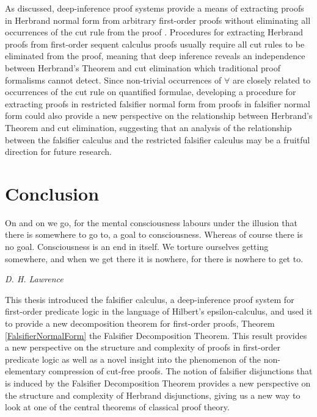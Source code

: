 \documentclass[10pt]{article}
\theoremstyle{definition}\newtheorem{remark}[theorem]{Remark}
\theoremstyle{definition}\newtheorem{example}[theorem]{Example}
\theoremstyle{definition}\newtheorem{definition}[theorem]{Definition}
\begin{document}
	As discussed, deep-inference proof systems provide a means of extracting proofs in Herbrand normal form from arbitrary first-order proofs without eliminating all occurrences of the cut rule from the proof \cite{KaiCutElimination}. Procedures for extracting Herbrand proofs from first-order sequent calculus proofs usually require all cut rules to be eliminated from the proof, meaning that deep inference reveals an independence between Herbrand's Theorem and cut elimination which traditional proof formalisms cannot detect. Since non-trivial occurrences of $\forall$ are closely related to occurrences of the cut rule on quantified formulae, developing a procedure for extracting proofs in restricted falsifier normal form from proofs in falsifier normal form could also provide a new perspective on the relationship between Herbrand's Theorem and cut elimination, suggesting that an analysis of the relationship between the falsifier calculus and the restricted falsifier calculus may be a fruitful direction for future research.
	
	\pagebreak
	
	\section{Conclusion}\label{ConclusionSection}
	
	\epigraph{On and on we go, for the mental consciousness labours under the illusion that there is somewhere to go to, a goal to consciousness. Whereas of course there is no goal. Consciousness is an end in itself. We torture ourselves getting somewhere, and when we get there it is nowhere, for there is nowhere to get to.}{\textit{D. H. Lawrence}}
	
	\noindent
	This thesis introduced the falsifier calculus, a deep-inference proof system for first-order predicate logic in the language of Hilbert's epsilon-calculus, and used it to provide a new decomposition theorem for first-order proofs, Theorem \ref{FalsifierNormalForm} the Falsifier Decomposition Theorem. This result provides a new perspective on the structure and complexity of proofs in first-order predicate logic as well as a novel insight into the phenomenon of the non-elementary compression of cut-free proofs. The notion of falsifier disjunctions that is induced by the Falsifier Decomposition Theorem provides a new perspective on the structure and complexity of Herbrand disjunctions, giving us a new way to look at one of the central theorems of classical proof theory.
	
\end{document}

